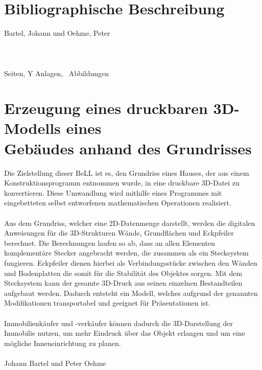 \section*{Bibliographische Beschreibung}
Bartel, Johann und Oehme, Peter\\\\
\q{\docTitle}\\\\
 \pageref{LastPage} Seiten, Y Anlagen, \totalfigures\ Abbildungen
 
  \newpage
 
\section*{Erzeugung eines druckbaren 3D-Modells eines \\ Gebäudes anhand des Grundrisses}
 	
 
 Die Zielstellung dieser BeLL ist es, den Grundriss eines Hauses, der aus einem Konstruktionsprogramm entnommen wurde, in eine druckbare 3D-Datei zu konvertieren.
 Diese Umwandlung wird mithilfe eines Programmes mit eingebetteten selbst entworfenen mathematischen Operationen realisiert.\\\\
 Aus dem Grundriss, welcher eine 2D-Datenmenge darstellt, werden die digitalen Anweisungen für die 3D-Strukturen Wände, Grundflächen und Eckpfeiler berechnet. 
 Die Berechnungen laufen so ab, dass an allen Elementen komplementäre Stecker angebracht werden, die zusammen als ein Stecksystem fungieren. 
 Eckpfeiler dienen hierbei als Verbindungsstücke zwischen den Wänden und Bodenplatten die somit für die Stabilität des Objektes  sorgen. 
 Mit dem Stecksystem kann der gesamte 3D-Druck aus seinen einzelnen Bestandteilen aufgebaut werden. 
 Dadurch entsteht ein Modell, welches aufgrund der genannten Modifikationen transportabel und geeignet für Präsentationen ist.\\\\
 Immobilienkäufer und -verkäufer können dadurch die 3D-Darstellung der Immobilie  nutzen, um mehr Eindruck über das Objekt erlangen und um eine mögliche Inneneinrichtung zu planen.\\\\
 Johann Bartel und Peter Oehme
